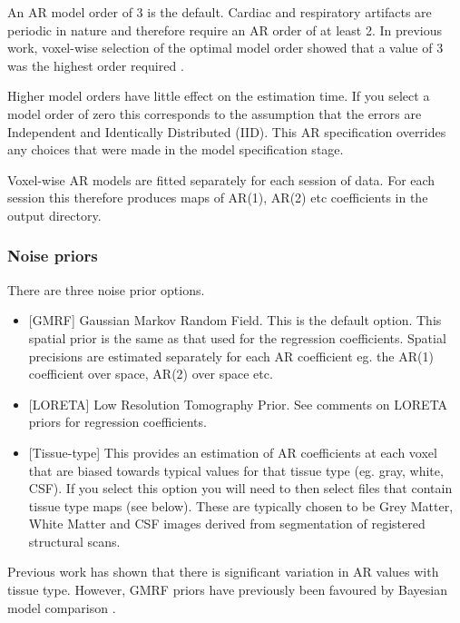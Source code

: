 An AR model order of 3 is the default. Cardiac and respiratory artifacts are periodic in nature and therefore require an AR order of at least 2. In previous work, voxel-wise selection of the optimal model order showed that a value of 3 was the highest order required \cite{vb_fmri_ar}.

Higher model orders have little effect on the estimation time. If you select a model order of zero this corresponds to the assumption that the errors are Independent and Identically Distributed (IID). This AR specification overrides any choices that were made in the model specification stage.

Voxel-wise AR models are fitted separately for each session of data. For each session this therefore produces maps of AR(1), AR(2) etc coefficients in the output directory. 

\subsubsection{Noise priors}

There are three noise prior options.

\begin{itemize}

\item{[GMRF] Gaussian Markov Random Field. This is the default option. This spatial prior is the same as that used for the regression coefficients. Spatial precisions are estimated separately for each AR coefficient eg. the AR(1) coefficient over space, AR(2) over space etc.}

\item{[LORETA] Low Resolution Tomography Prior. See comments on LORETA priors for regression coefficients.}

\item{[Tissue-type] This provides an estimation of AR coefficients at each voxel that are biased towards typical values for that tissue type (eg. gray, white, CSF). If you select this option you will need to then select files that contain tissue type maps (see below). These are typically chosen to be Grey Matter, White Matter and CSF images derived from segmentation of registered structural scans.}

\end{itemize}
                                                                                                            
Previous work has shown that there is significant variation in AR values with tissue type. However, GMRF priors have previously been favoured by Bayesian model comparison \cite{will_bayes_srglm}.

